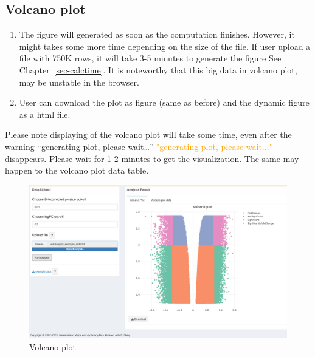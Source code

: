 \documentclass[
  a4paper,
  oneside,
  open=any]{scrreport}
\providecommand{\tightlist}{%
  \setlength{\itemsep}{0pt}\setlength{\parskip}{0pt}}\usepackage{longtable,booktabs,array}
\begin{document}
\hypertarget{volcano-plot}{%
\subsection{Volcano plot}\label{volcano-plot}}

\begin{enumerate}
\def\labelenumi{\arabic{enumi}.}
\tightlist
\item
  The figure will generated as soon as the computation finishes.
  However, it might takes some more time depending on the size of the
  file. If user upload a file with 750K rows, it will take 3-5 minutes
  to generate the figure See Chapter~\ref{sec-calctime}. It is
  noteworthy that this big data in volcano plot, may be unstable in the
  browser.
\item
  User can download the plot as figure (same as before) and the dynamic
  figure as a html file.\\
\end{enumerate}

\begin{tcolorbox}[enhanced jigsaw, left=2mm, colback=white, breakable, leftrule=.75mm, coltitle=black, toprule=.15mm, rightrule=.15mm, colbacktitle=quarto-callout-note-color!10!white, title=\textcolor{quarto-callout-note-color}{\faInfo}\hspace{0.5em}{Note}, opacitybacktitle=0.6, colframe=quarto-callout-note-color-frame, bottomrule=.15mm, bottomtitle=1mm, toptitle=1mm, titlerule=0mm, opacityback=0, arc=.35mm]
Please note displaying of the volcano plot will take some time, even
after the warning {``generating plot, please wait\ldots{}''}
\textcolor{orange}{"generating plot, please wait..."} disappears. Please
wait for 1-2 minutes to get the visualization. The same may happen to
the volcano plot data table.
\end{tcolorbox}

\begin{figure}[H]

{\centering \includegraphics{./_images/Volcano1.png}

}

\caption{Volcano plot}

\end{figure}
\end{document}
